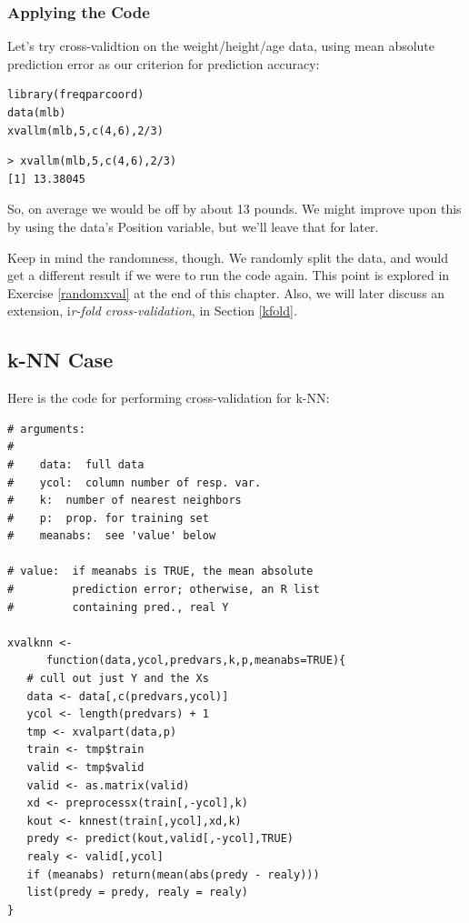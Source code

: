 \subsubsection{Applying the Code}
\label{applyingxval}

Let's try cross-validtion on the weight/height/age data, using mean
absolute prediction error as our criterion for prediction accuracy:

\begin{lstlisting}
library(freqparcoord)
data(mlb)
xvallm(mlb,5,c(4,6),2/3)
\end{lstlisting}

\begin{lstlisting}
> xvallm(mlb,5,c(4,6),2/3)
[1] 13.38045
\end{lstlisting}

So, on average we would be off by about 13 pounds.  We might improve upon
this by using the data's Position variable, but we'll leave that for
later.

Keep in mind the randomness, though.  We randomly split the data, and
would get a different result if we were to run the code again.  This
point is explored in Exercise \ref{randomxval} at the end of this
chapter.  Also, we will later discuss an extension, i{\it r-fold
cross-validation}, in Section \ref{kfold}.

\subsection{k-NN Case}

Here is the code for performing cross-validation for k-NN:

\begin{lstlisting}
# arguments:
#
#    data:  full data
#    ycol:  column number of resp. var.
#    k:  number of nearest neighbors
#    p:  prop. for training set
#    meanabs:  see 'value' below

# value:  if meanabs is TRUE, the mean absolute 
#         prediction error; otherwise, an R list
#         containing pred., real Y

xvalknn <- 
      function(data,ycol,predvars,k,p,meanabs=TRUE){
   # cull out just Y and the Xs
   data <- data[,c(predvars,ycol)]
   ycol <- length(predvars) + 1
   tmp <- xvalpart(data,p)
   train <- tmp$train
   valid <- tmp$valid
   valid <- as.matrix(valid)
   xd <- preprocessx(train[,-ycol],k)
   kout <- knnest(train[,ycol],xd,k)
   predy <- predict(kout,valid[,-ycol],TRUE)
   realy <- valid[,ycol]
   if (meanabs) return(mean(abs(predy - realy)))
   list(predy = predy, realy = realy)
}
\end{lstlisting}


